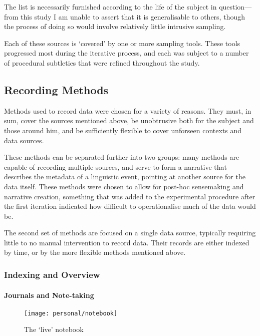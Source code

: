 The list is necessarily furnished according to the life of the subject in question---from this study I am unable to assert that it is generalisable to others, though the process of doing so would involve relatively little intrusive sampling.

Each of these sources is `covered' by one or more sampling tools.  These tools progressed most during the iterative process, and each was subject to a number of procedural subtleties that were refined throughout the study.










\subsection{Recording Methods}
Methods used to record data were chosen for a variety of reasons.  They must, in sum, cover the sources mentioned above, be unobtrusive both for the subject and those around him, and be sufficiently flexible to cover unforseen contexts and data sources.

These methods can be separated further into two groups: many methods are capable of recording multiple sources, and serve to form a narrative that describes the metadata of a linguistic event, pointing at another source for the data itself.  These methods were chosen to allow for post-hoc sensemaking and narrative creation, something that was added to the experimental procedure after the first iteration indicated how difficult to operationalise much of the data would be.

The second set of methods are focused on a single data source, typically requiring little to no manual intervention to record data.  Their records are either indexed by time, or by the more flexible methods mentioned above.


\subsubsection{Indexing and Overview}
\paragraph{Journals and Note-taking}

\begin{figure}[p]
    \centering
    \texttt{[image: personal/notebook]}
    \caption{The `live' notebook}
    \label{fig:personal:online_notebook}
\end{figure}


